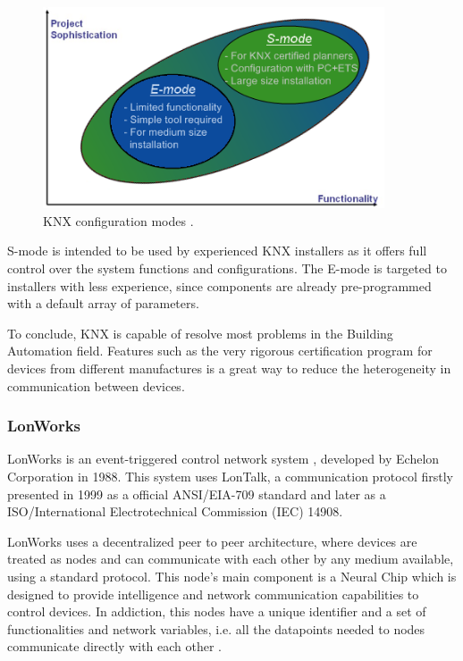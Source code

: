 \begin{figure}[H]
	\centering
	\includegraphics[width=0.9\textwidth]{figures/knxmodes.png}
	\caption{KNX configuration modes \cite{knx}. }
	\label{fig:knx_modes}
\end{figure}
 
 S-mode is intended to be used by experienced KNX installers as it offers full control over the system functions and configurations. The E-mode is targeted to installers with less experience, since components are already pre-programmed with a default array of parameters.
 
To conclude, KNX is capable of resolve most problems in the Building Automation field. Features such as the very rigorous certification program for devices from different manufactures is a great way to reduce the heterogeneity in communication between devices.

 
\subsubsection{LonWorks}

LonWorks is an event-triggered control network system \cite{Osorio}, developed by Echelon Corporation \cite{echelon} in 1988. This system uses LonTalk, a communication protocol firstly presented in 1999 as a official ANSI/EIA-709 standard and later as a ISO/International Electrotechnical Commission (IEC) 14908.

LonWorks uses a decentralized peer to peer architecture, where devices are treated as nodes and can communicate with each other by any medium available, using a standard protocol. This node's main component is a Neural Chip which is designed to provide intelligence and network communication capabilities to control devices. In addiction, this nodes have a unique identifier and a set of functionalities and network variables, i.e. all the datapoints needed to nodes communicate directly with each other \cite{Domingues2016}.

